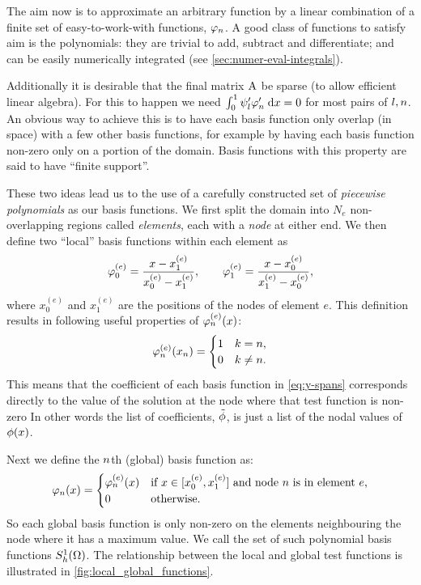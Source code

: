 The aim now is to approximate an arbitrary function by a linear combination of a finite set of easy-to-work-with functions, $\varphi_n$.
A good class of functions to satisfy aim is the polynomials: they are trivial to add, subtract and differentiate; and can be easily numerically integrated (see \cref{sec:numer-eval-integrals}).

Additionally it is desirable that the final matrix $\mathrm{A}$ be sparse (to allow efficient linear algebra).
For this to happen we need ${\int_0^1  \psi_l'\varphi'_{n}  {\; \mathrm{{d}}}{x}} = 0$ for most pairs of $l, n$.
An obvious way to achieve this is to have each basis function only overlap (in space) with a few other basis functions, for example by having each basis function non-zero only on a portion of the domain.
Basis functions with this property are said to have ``finite support''.

These two ideas lead us to the use of a carefully constructed set of \emph{piecewise polynomials} as our basis functions.
We first split the domain into $N_e$ non-overlapping regions called \emph{elements}, each with a \emph{node} at either end.
We then define two ``local'' basis functions within each element as
\begin{equation}
  \varphi^{(e)}_{0}=\dfrac{x-x^{(e)}_{1}}{x^{(e)}_{0}-x^{(e)}_{1}},\qquad
  \varphi^{(e)}_{1}=\dfrac{x-x^{(e)}_{0}}{x^{(e)}_{1}-x^{(e)}_{0}},
  \label{eq:simple_lagrange}
\end{equation}
where $x^{(e)}_0$ and $x^{(e)}_1$ are the positions of the nodes of element $e$.
This definition results in following useful properties of $\varphi^{(e)}_{n}(x)$:
\begin{equation}
  \label{eq:35}
  \varphi^{(e)}_{n}(x_{n}) =
  \begin{cases}
    1 & k = n, \\
    0 & k \neq n.
  \end{cases}
\end{equation}
This means that the coefficient of each basis function in \cref{eq:y-spans} corresponds directly to the value of the solution at the node where that test function is non-zero
In other words the list of coefficients, $\tilde{\phi}$, is just a list of the nodal values of $\phi(x)$.

Next we define the $n$th (global) basis function as:
\begin{equation}
  \label{eq:33}
  \varphi_n(x) =
  \begin{cases}
    \varphi_n^{(e)}(x) & \text{if $x \in [x^{(e)}_0, x^{(e)}_1]$ and node $n$ is in element $e$,} \\
    0 & \text{otherwise.}
  \end{cases}
\end{equation}
So each global basis function is only non-zero on the elements neighbouring the node where it has a maximum value.
We call the set of such polynomial basis functions ${S_h^1(\Omega)}$.
The relationship between the local and global test functions is illustrated in \cref{fig:local_global_functions}.


